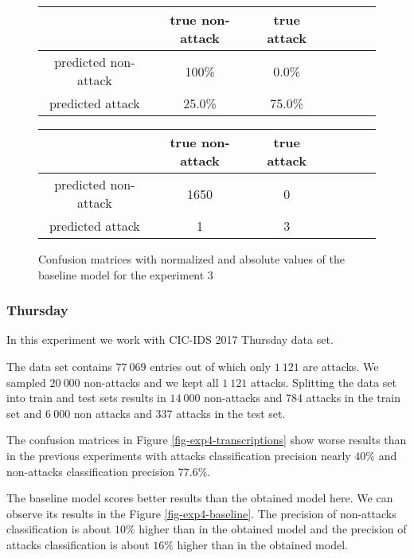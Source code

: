 \documentclass{article}
\begin{document}
\begin{figure}[h!]
    \centering
    \begin{tabular}{ |c|c|c|c|c|c|c| }
     \hline
      & true non-attack & true attack \\
     \hline
     predicted non-attack & 100\% & 0.0\% \\
     \hline
     predicted attack & 25.0\% & 75.0\% \\
     \hline
    \end{tabular}

    \vspace{0.2cm}

    \centering
    \begin{tabular}{ |c|c|c|c|c|c|c| }
     \hline
      & true non-attack & true attack \\
     \hline
     predicted non-attack & 1650 & 0 \\
     \hline
     predicted attack & 1 & 3 \\
     \hline
    \end{tabular}
    \caption{Confusion matrices with normalized and absolute values of the baseline model for the experiment 3}
    \label{fig-exp3-baseline}
\end{figure}

\clearpage


\subsubsection{Thursday}
In this experiment we work with CIC-IDS 2017 Thursday data set.

The data set contains $77\ 069$ entries out of which only $1\ 121$ are attacks. We sampled $20\ 000$ non-attacks and we kept all $1\ 121$ attacks. Splitting the data set into train and test sets results in $14\ 000$ non-attacks and 784 attacks in the train set and $6\ 000$ non attacks and 337 attacks in the test set.

The confusion matrices in Figure \ref{fig-exp4-transcriptions} show worse results than in the previous experiments with attacks classification precision nearly $40\%$ and non-attacks classification precision $77.6\%$.

The baseline model scores better results than the obtained model here. We can observe its results in the Figure \ref{fig-exp4-baseline}. The precision of non-attacks classification is about $10\%$ higher than in the obtained model and the precision of attacks classification is about $16\%$ higher than in the obtained model.
\end{document}
